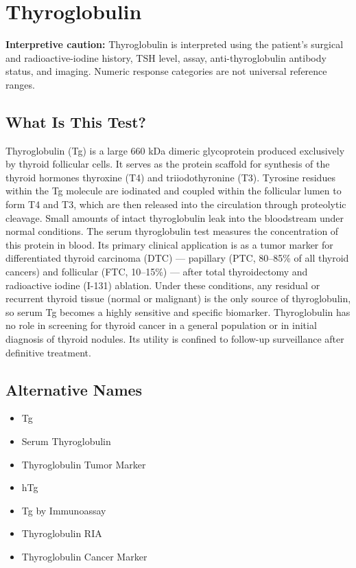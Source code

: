 \chapter{Thyroglobulin}

\textbf{Interpretive caution:} Thyroglobulin is interpreted using the patient's surgical and radioactive-iodine history, TSH level, assay, anti-thyroglobulin antibody status, and imaging. Numeric response categories are not universal reference ranges.

\section*{What Is This Test?}
Thyroglobulin (Tg) is a large 660 kDa dimeric glycoprotein produced exclusively by thyroid follicular cells. It serves as the protein scaffold for synthesis of the thyroid hormones thyroxine (T4) and triiodothyronine (T3). Tyrosine residues within the Tg molecule are iodinated and coupled within the follicular lumen to form T4 and T3, which are then released into the circulation through proteolytic cleavage. Small amounts of intact thyroglobulin leak into the bloodstream under normal conditions. The serum thyroglobulin test measures the concentration of this protein in blood. Its primary clinical application is as a tumor marker for differentiated thyroid carcinoma (DTC) --- papillary (PTC, 80--85\% of all thyroid cancers) and follicular (FTC, 10--15\%) --- after total thyroidectomy and radioactive iodine (I-131) ablation. Under these conditions, any residual or recurrent thyroid tissue (normal or malignant) is the only source of thyroglobulin, so serum Tg becomes a highly sensitive and specific biomarker. Thyroglobulin has no role in screening for thyroid cancer in a general population or in initial diagnosis of thyroid nodules. Its utility is confined to follow-up surveillance after definitive treatment.

\section*{Alternative Names}
\begin{itemize}
  \item Tg
  \item Serum Thyroglobulin
  \item Thyroglobulin Tumor Marker
  \item hTg
  \item Tg by Immunoassay
  \item Thyroglobulin RIA
  \item Thyroglobulin Cancer Marker
\end{itemize}
